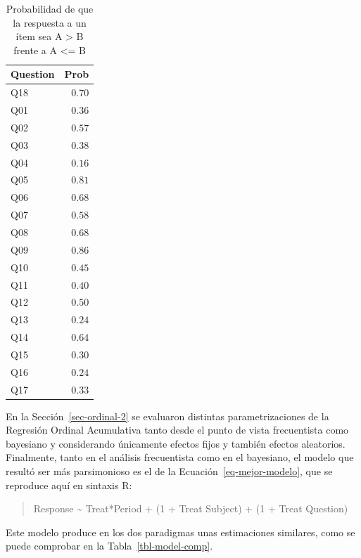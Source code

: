 \documentclass[
  12pt,
  a4paper,
  extrafontsizes,
  onecolumn,
  openright,
  table]{memoir}
\begin{document}
\hypertarget{tbl-improve-question}{}
\begin{longtable}{lr}
\caption{\label{tbl-improve-question}Probabilidad de que la respuesta a un ítem sea A \textgreater{} B frente
a A \textless= B }\tabularnewline

\toprule
Question & Prob \\ 
\midrule
Q18 & $0.70$ \\ 
Q01 & $0.36$ \\ 
Q02 & $0.57$ \\ 
Q03 & $0.38$ \\ 
Q04 & $0.16$ \\ 
Q05 & $0.81$ \\ 
Q06 & $0.68$ \\ 
Q07 & $0.58$ \\ 
Q08 & $0.68$ \\ 
Q09 & $0.86$ \\ 
Q10 & $0.45$ \\ 
Q11 & $0.40$ \\ 
Q12 & $0.50$ \\ 
Q13 & $0.24$ \\ 
Q14 & $0.64$ \\ 
Q15 & $0.30$ \\ 
Q16 & $0.24$ \\ 
Q17 & $0.33$ \\ 
\bottomrule
\end{longtable}

\normalsize

En la Sección~\ref{sec-ordinal-2} se evaluaron distintas
parametrizaciones de la Regresión Ordinal Acumulativa tanto desde el
punto de vista frecuentista como bayesiano y considerando únicamente
efectos fijos y también efectos aleatorios. Finalmente, tanto en el
análisis frecuentista como en el bayesiano, el modelo que resultó ser
más parsimonioso es el de la Ecuación~\ref{eq-mejor-modelo}, que se
reproduce aquí en sintaxis R:

\small

\begin{quote}
Response \textasciitilde{} Treat*Period + (1 + Treat \textbar{} Subject)
+ (1 + Treat \textbar{} Question) \normalsize
\end{quote}

Este modelo produce en los dos paradigmas unas estimaciones similares,
como se puede comprobar en la Tabla~\ref{tbl-model-comp}.

\tiny
\end{document}
